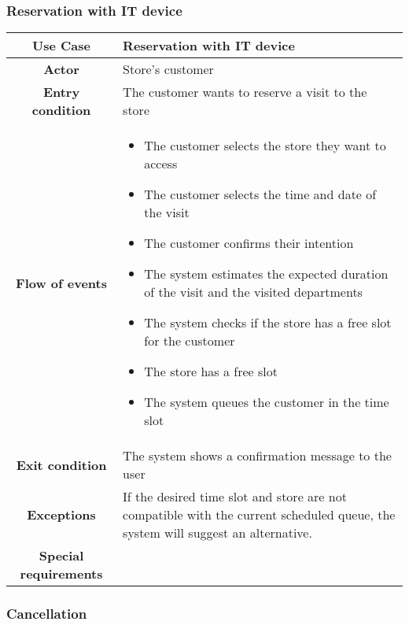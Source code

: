 \documentclass[../../main.tex]{subfiles}
\begin{document}
      \subsubsection{Reservation with IT device}

      \begin{table}[H]
        \centering
          \begin{tabular}{c m{}}
          \hline
          \textbf{Use Case} & Reservation with IT device\\ \hline
          \textbf{Actor} & Store's customer\\ \hline
          \textbf{Entry condition} & The customer wants to reserve a visit to the store\\  \hline
          \textbf{Flow of events} & \begin{itemize}
                                      \item The customer selects the store they want to access
                                      \item The customer selects the time and date of the visit
                                      \item The customer confirms their intention
                                      \item The system estimates the expected duration of the visit and the visited departments
                                      \item The system checks if the store has a free slot for the customer
                                      \item The store has a free slot
                                      \item The system queues the customer in the time slot
                                    \end{itemize}\\ \hline
          \textbf{Exit condition} & The system shows a confirmation message to the user \\ \hline
          \textbf{Exceptions} & If the desired time slot and store are not compatible with the current scheduled queue, the system will suggest an alternative. \\ \hline
          \textbf{Special requirements} &\\ \hline
          \end{tabular}
      \end{table}

      \subsubsection{Cancellation}
\end{document}
